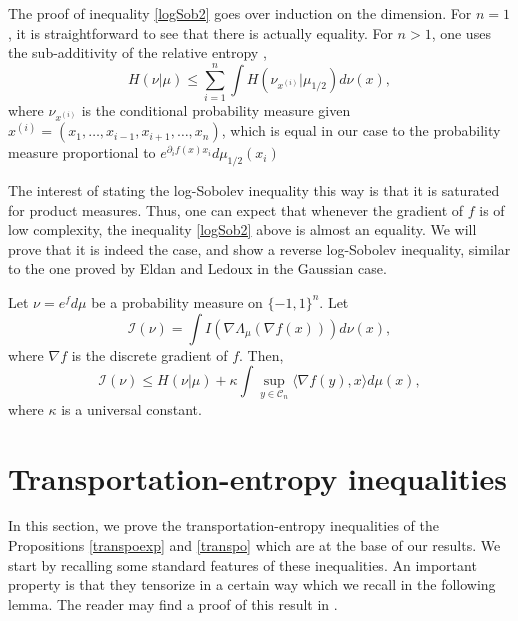 \documentclass[a4paper,oneside,11pt]{article}
\begin{document}
The proof of inequality \eqref{logSob2} goes over induction on the dimension. For $n=1$, it is straightforward to see that there is actually equality. For $n>1$, one uses the sub-additivity of the relative entropy \cite[Proposition 5.6]{Ledouxmono},
$$ H(\nu|\mu) \leq \sum_{i=1}^n \int H(\nu_{x^{(i)}} | \mu_{1/2}) d\nu(x),$$
where $\nu_{x^{(i)}}$ is the conditional probability measure given $x^{(i)} = (x_1,\ldots,x_{i-1},x_{i+1},\ldots,x_n)$, which is equal in our case to the probability measure proportional to $e^{\partial_if(x)x_i} d \mu_{1/2}(x_i)$


The interest of stating the log-Sobolev inequality this way is that it is saturated for product measures. Thus, one can expect that whenever the gradient of $f$ is of low complexity, the inequality \eqref{logSob2} above is almost an equality. We will prove that it is indeed the case, and show a reverse log-Sobolev inequality, similar to the one proved by Eldan and Ledoux \cite{LedouxE} in the Gaussian case.


\begin{Pro}
\label{revlogSob}
Let $\nu =e^f d\mu$ be a probability measure on $\{-1,1\}^n$. Let
$$ \mathcal{I}(\nu) = \int I(\nabla \Lambda_\mu (\nabla f(x))) d\nu(x),$$
where $\nabla f$ is the discrete gradient of $f$.
 Then,
$$ \mathcal{I}(\nu) \leq H(\nu |\mu) + \kappa \int \sup
_{y \in \mathcal{C}_n} \langle \nabla f(y), x \rangle d\mu(x),$$ 
where $\kappa$ is a universal constant.

\end{Pro}




\section{Transportation-entropy inequalities} 
In this section, we prove the transportation-entropy inequalities of the Propositions \ref{transpoexp} and \ref{transpo} which are at the base of our results. We start by recalling some standard features of these inequalities.
An important property is that they tensorize in a certain way which we recall in the following lemma.  The reader may find a proof of this result in \cite[Proposition 1.3]{GL}.
\end{document}

